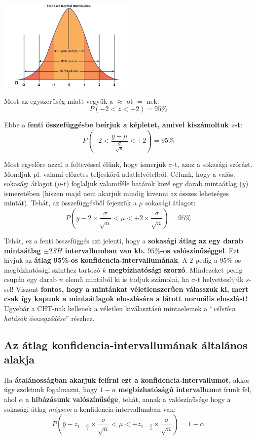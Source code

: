 \documentclass[
]{book}
\begin{document}
\includegraphics[width=0.5\textwidth,height=\textheight]{stnormal.png}

Most az egyszerűség miatt vegyük a \(\approx\)-ot \(=\)-nek: \[P(-2<z<+2) = 95\%\]

Ebbe a \textbf{fenti összefüggésbe beírjuk a képletet, amivel kiszámoltuk \(z\)-t}: \[P\left(-2< \frac{\bar{y}-\mu}{\frac{\sigma}{\sqrt{n}}} <+2\right) = 95\%\]

Most egyelőre azzal a feltevéssel élünk, hogy ismerjük \(\sigma\)-t, azaz a sokasági szórást. Mondjuk pl. valami előzetes teljeskörű adatfelvételből. Célunk, hogy a valós, sokasági átlagot (\(\mu\)-t) foglaljuk valamiféle határok közé egy darab mintaátlag (\(\bar{y}\)) ismeretében (hiszen majd nem akarjuk mindig kivenni az összes lehetséges mintát). Tehát, az összefüggésből fejezzük a \(\mu\) sokasági átlagot: \[P\left(\bar{y}-2 \times \frac{\sigma}{\sqrt{n}}< \mu <+2 \times \frac{\sigma}{\sqrt{n}}\right) = 95\%\]

Tehát, ez a fenti összefüggés azt jelenti, hogy a \textbf{sokasági átlag az egy darab mintaátlag \(\pm 2SH\) intervallumban van kb. \(95\%\)-os valószínűséggel}. Ezt hívjuk az \textbf{átlag 95\%-os konfidencia-intervallumának}. A \(2\) pedig a \(95\%\)-os megbízhatósági szinthez tartozó \(k\) \textbf{megbízhatósági szorzó}. Mindezeket pedig csupán egy darab \(n\) elemű mintából ki is tudjuk számolni, ha \(\sigma\)-t helyettesítjük \(s\)-sel! Viszont \textbf{fontos, hogy a mintánkat véletlenszerűen válasszuk ki, mert csak így kapunk a mintaátlagok eloszlására a látott normális eloszlást!} Ugyebár a CHT-nak kellenek a véletlen kiválasztású mintaelemek a ``\emph{véletlen hatások összegződése}'' részhez.

\subsection{Az átlag konfidencia-intervallumának általános alakja}\label{az-uxe1tlag-konfidencia-intervallumuxe1nak-uxe1ltaluxe1nos-alakja}

Ha \textbf{átalánosságban akarjuk felírni ezt a konfidencia-intervallumot}, akkor úgy szoktunk fogalmazni, hogy \(1-\alpha\) \textbf{megbízhatóságú intervallum}ot írunk fel, ahol \(\alpha\) a \textbf{hibázásunk valószínűsége}, tehát, annak a valószínűsége hogy a sokasági átlag \emph{mégsem} a konfidencia-intervallumban van: \[P\left(\bar{y}-z_{1-\frac{\alpha}{2}} \times \frac{\sigma}{\sqrt{n}}< \mu <+z_{1-\frac{\alpha}{2}} \times \frac{\sigma}{\sqrt{n}}\right) = 1- \alpha\]
\end{document}
